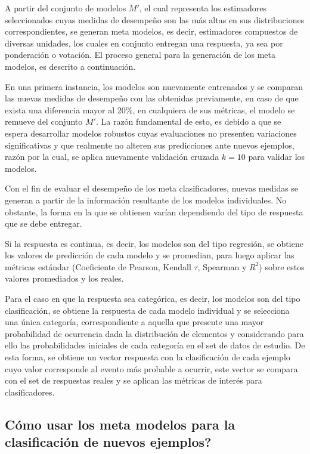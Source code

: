 A partir del conjunto de modelos $M'$, el cual representa los estimadores seleccionados cuyas medidas de desempeño son las más altas en sus distribuciones correspondientes, se generan meta modelos, es decir, estimadores compuestos de diversas unidades, los cuales en conjunto entregan una respuesta, ya sea por ponderación o votación. El proceso general para la generación de los meta modelos, es descrito a continuación.

En una primera instancia, los modelos son nuevamente entrenados y se comparan las nuevas medidas de desempeño con las obtenidas previamente, en caso de que exista una diferencia mayor al 20\%, en cualquiera de sus métricas, el modelo se remueve del conjunto $M'$. La razón fundamental de esto, es debido a que se espera desarrollar modelos robustos cuyas evaluaciones no presenten variaciones significativas y que realmente no alteren sus predicciones ante nuevos ejemplos, razón por la cual, se aplica nuevamente validación cruzada $k=10$ para validar los modelos.

Con el fin de evaluar el desempeño de los meta clasificadores, nuevas medidas se generan a partir de la información resultante de los modelos individuales. No obstante, la forma en la que se obtienen varían dependiendo del tipo de respuesta que se debe entregar.

Si la respuesta es continua, es decir, los modelos son del tipo regresión, se obtiene los valores de predicción de cada modelo y se promedian, para luego aplicar las métricas estándar (Coeficiente de Pearson, Kendall $\tau$, Spearman y $R^{2}$) sobre estos valores promediados y los reales. 

Para el caso en que la respuesta sea categórica, es decir, los modelos son del tipo clasificación, se obtiene la respuesta de cada modelo individual y se selecciona una única categoría, correspondiente a aquella que presente una mayor probabilidad de ocurrencia dada la distribución de elementos y considerando para ello las probabilidades iniciales de cada categoría en el set de datos de estudio. De esta forma, se obtiene un vector respuesta con la clasificación de cada ejemplo cuyo valor corresponde al evento más probable a ocurrir, este vector se compara con el set de respuestas reales y se aplican las métricas de interés para clasificadores.

\subsection{Cómo usar los meta modelos para la clasificación de nuevos ejemplos?}

